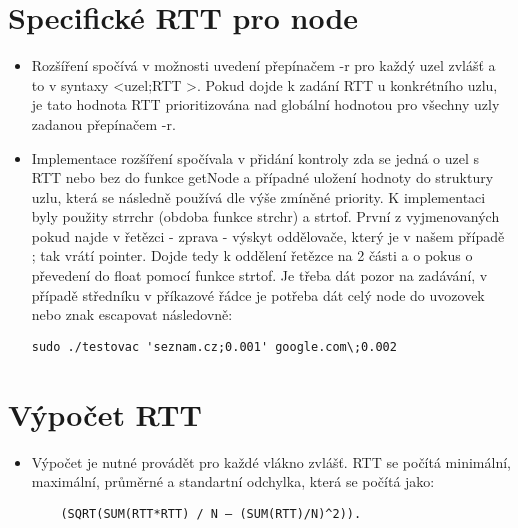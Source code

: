 \documentclass[a4paper,11pt]{article}
\begin{document}
\section*{Specifické RTT pro node}
\begin{itemize}
  \item Rozšíření spočívá v možnosti uvedení přepínačem -r pro každý uzel zvlášť a to v syntaxy \textless uzel;RTT \textgreater.
  Pokud dojde k zadání RTT u konkrétního uzlu, je tato hodnota RTT prioritizována nad globální hodnotou pro všechny uzly zadanou přepínačem -r.

  \item Implementace rozšíření spočívala v přidání kontroly zda se jedná o uzel s RTT nebo bez do funkce getNode a případné uložení hodnoty do
  struktury uzlu, která se následně používá dle výše zmíněné priority. K implementaci byly použity strrchr (obdoba funkce strchr) a strtof. První z vyjmenovaných pokud
  najde v řetězci - zprava - výskyt oddělovače, který je v našem případě ; tak vrátí pointer. Dojde tedy k oddělení řetězce na 2 části a o pokus o převedení do float pomocí funkce strtof.
  Je třeba dát pozor na zadávání, v případě středníku v příkazové řádce je potřeba dát celý node do uvozovek nebo znak escapovat následovně:

  \lstset{language=Bash}
  \begin{lstlisting}[frame=single,breaklines]
    sudo ./testovac 'seznam.cz;0.001' google.com\;0.002
  \end{lstlisting}

\end{itemize}

\section*{Výpočet RTT}
\begin{itemize}
  \item Výpočet je nutné provádět pro každé vlákno zvlášť. RTT se počítá minimální, maximální, průměrné a standartní odchylka, která se počítá jako:
\begin{verbatim}
    (SQRT(SUM(RTT*RTT) / N – (SUM(RTT)/N)^2)).
\end{verbatim}
\end{itemize}
\end{document}
